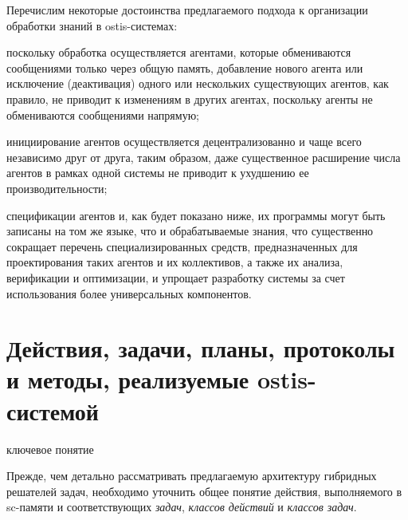 Перечислим некоторые достоинства предлагаемого подхода к организации обработки знаний в ostis-системах:
\begin{textitemize}
	\item поскольку обработка осуществляется агентами, которые обмениваются сообщениями только через общую память, добавление нового агента или исключение (деактивация) одного или нескольких существующих агентов, как правило, не приводит к изменениям в других агентах, поскольку агенты не обмениваются сообщениями напрямую;
	\item инициирование агентов осуществляется децентрализованно и чаще всего независимо друг от друга, таким образом, даже существенное расширение числа агентов в рамках одной системы не приводит к ухудшению ее производительности;
	\item спецификации агентов и, как будет показано ниже, их программы могут быть записаны на том же языке, что и обрабатываемые знания, что существенно сокращает перечень специализированных средств, предназначенных для проектирования таких агентов и их коллективов, а также их анализа, верификации и оптимизации, и упрощает разработку системы за счет использования более универсальных компонентов.
\end{textitemize}

\section{Действия, задачи, планы, протоколы и методы, реализуемые ostis-системой}
\label{sec_ps_actions}

\begin{SCn}
\begin{scnrelfromlist}{ключевое понятие}
\end{scnrelfromlist}
\end{SCn}

Прежде, чем детально рассматривать предлагаемую архитектуру гибридных решателей задач, необходимо уточнить общее понятие действия, выполняемого в sc-памяти и соответствующих \textit{задач}, \textit{классов действий} и \textit{классов задач}.

\begin{SCn}
\end{SCn}

